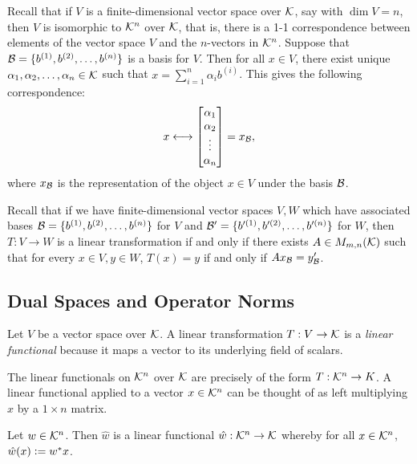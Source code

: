 Recall that if $V$ is a finite-dimensional vector space over $\mathcal{K}$, say with $\dim V = n$, then $V$ is isomorphic to $\mathcal{K}^n$ over $\mathcal{K}$, that is, there is a 1-1 correspondence between elements of the vector space $V$ and the $n$-vectors in $\mathcal{K}^n$. Suppose that $\mathcal{B} = \{b^{(1)}, b^{(2)}, \dots, b^{(n)}\}$ is a basis for $V$. Then for all $x \in V$, there exist unique $\alpha_1, \alpha_2, \dots, \alpha_n \in \mathcal{K}$ such that $x = \sum_{i=1}^n \alpha_i b^{(i)}$. This gives the following correspondence: 
$$
x \longleftrightarrow \begin{bmatrix} \alpha_1 \\ \alpha_2 \\ \vdots \\ \alpha_n \end{bmatrix} = x_{\mathcal{B}},
$$
where $x_{\mathcal{B}}$ is the representation of the object $x \in V$ under the basis $\mathcal{B}$.

Recall that if we have finite-dimensional vector spaces $V,W$ which have associated bases $\mathcal{B} = \{b^{(1)}, b^{(2)}, \dots, b^{(n)}\}$ for $V$ and $\mathcal{B}' = \{b'^{(1)}, b'^{(2)}, \dots, b'^{(n)}\}$ for $W$, then $T: V \rightarrow W$ is a linear transformation if and only if there exists $A \in M_{m,n}(\mathcal{K})$ such that for every $x \in V, y \in W$, $T(x) = y$ if and only if $Ax_{\mathcal{B}} = y_{\mathcal{B}}'$.

\subsection{Dual Spaces and Operator Norms}
\begin{definition}
\label{def:linear-functional}
Let $V$ be a vector space over $\mathcal{K}$. A linear transformation $T: V \rightarrow \mathcal{K}$ is a \textit{linear functional} because it maps a vector to its underlying field of scalars.
\end{definition}

\begin{note*}
The linear functionals on $\mathcal{K}^n$ over $\mathcal{K}$ are precisely of the form $T: \mathcal{K}^n \rightarrow K$. A linear functional applied to a vector $x \in \mathcal{K}^n$ can be thought of as left multiplying $x$ by a $1 \times n$ matrix.
\end{note*}

\begin{definition}
\label{def:linear-functional-kn}
Let $w \in \mathcal{K}^n$. Then $\hat{w}$ is a linear functional $\hat{w}: \mathcal{K}^n \rightarrow \mathcal{K}$ whereby for all $x \in \mathcal{K}^n$, $\hat{w}(x) \vcentcolon= w^*x$.
\end{definition}

